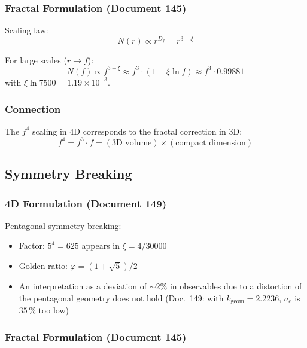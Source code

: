 	\subsubsection{Fractal Formulation (Document 145)}
	
	Scaling law:
	\begin{equation}
		N(r) \propto r^{D_f} = r^{3-\xi}
	\end{equation}
	
	For large scales ($r \to f$):
	\begin{equation}
		N(f) \propto f^{3-\xi} \approx f^3 \cdot (1 - \xi \ln f) \approx f^3 \cdot 0.99881
	\end{equation}
	with $\xi \ln 7500 = 1.19\times10^{-3}$.
	
	\subsubsection{Connection}
	
	The $f^4$ scaling in 4D corresponds to the fractal correction in 3D:
	\begin{equation}
		\boxed{f^4 = f^3 \cdot f = (\text{3D volume}) \times (\text{compact dimension})}
	\end{equation}
	
	\subsection{Symmetry Breaking}
	
	\subsubsection{4D Formulation (Document 149)}
	
	Pentagonal symmetry breaking:
	\begin{itemize}
		\item Factor: $5^4 = 625$ appears in $\xi = 4/30000$
		\item Golden ratio: $\varphi = (1+\sqrt{5})/2$
		\item An interpretation as a deviation of $\sim$2\% in observables due to a distortion of the pentagonal geometry does not hold (Doc.~149: with $k_\text{geom} = 2.2236$, $a_e$ is $35\,\%$ too low)
	\end{itemize}
	
	\subsubsection{Fractal Formulation (Document 145)}
	
